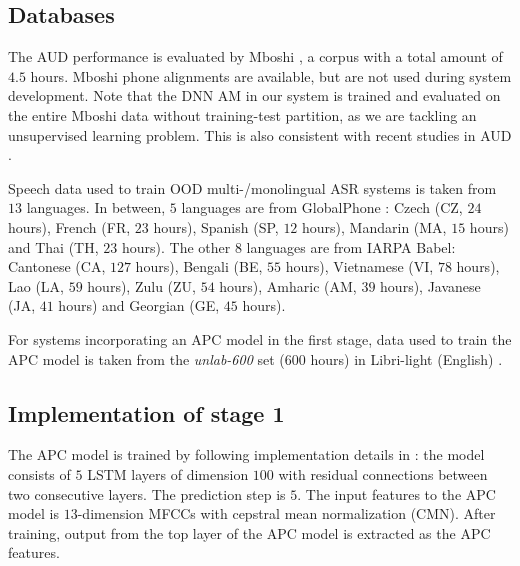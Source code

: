 \documentclass[a4paper]{article}
\begin{document}
\subsection{Databases}
\label{subsec:setup_database}
The AUD  performance    is evaluated by  Mboshi \cite{Godard2018mboshi}, a corpus
with a total amount of $4.5$ hours. Mboshi phone alignments are available, but are not used during   system development. Note that the DNN AM in our system is trained and evaluated on the entire Mboshi data without training-test partition, as we are tackling an unsupervised learning problem. This  is also consistent with   recent  studies in AUD \cite{Yusuf2020hierarchical,Ondel2019Bayesian}.

Speech data used to train OOD multi-/monolingual ASR systems is taken from $13$ languages. In between, $5$ languages are from GlobalPhone  \cite{schultz2002globalphone}: Czech (CZ, $24$ hours), French (FR, $23$ hours), Spanish (SP, $12$ hours), Mandarin (MA, $15$ hours) and Thai (TH, $23$ hours). The other $8$ languages are from IARPA Babel: Cantonese (CA, $127$ hours), Bengali (BE, $55$ hours), Vietnamese (VI, $78$ hours), Lao (LA, $59$ hours), Zulu (ZU, $54$ hours), Amharic (AM, $39$ hours), Javanese (JA, $41$ hours) and Georgian (GE, $45$ hours).

For systems incorporating an APC model in the first stage, data used to train the APC model is taken from the \textit{unlab-600} set ($600$ hours) in  Libri-light (English) \cite{kahn2019librilight}.

 

\subsection{Implementation of stage 1}
\label{subsec:setup_stage1}
The APC model is trained by  following  implementation details in \cite{feng2020unsupervised}: the model consists of $5$ LSTM layers of dimension $100$ with residual connections between two consecutive layers. The prediction step is $5$. The input features to the APC model is $13$-dimension MFCCs with cepstral mean normalization (CMN). 
After training, output from the top layer of the APC model is extracted as the APC features.
\end{document}
